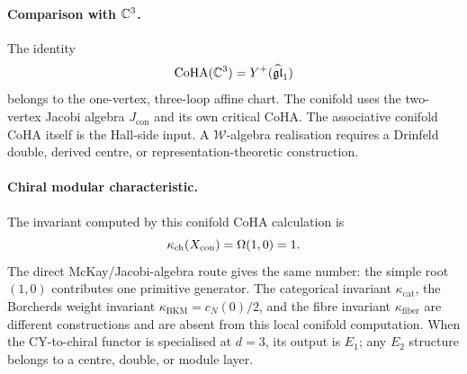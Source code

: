 \paragraph{Comparison with \(\mathbb{C}^3\).}
The identity
\[
  \mathrm{CoHA}(\mathbb{C}^3)=Y^+(\widehat{\mathfrak{gl}}_1)
\]
belongs to the one-vertex, three-loop affine chart. The conifold uses
the two-vertex Jacobi algebra \(J_{\mathrm{con}}\) and its own critical
CoHA. The associative conifold CoHA itself is the Hall-side input.
A \(\mathcal W\)-algebra realisation requires a Drinfeld double, derived
centre, or representation-theoretic construction.

\paragraph{Chiral modular characteristic.}
The invariant computed by this conifold CoHA calculation is
\[
  \kappa_{\mathrm{ch}}(X_{\mathrm{con}})
  =\Omega(1,0)=1.
\]
The direct McKay/Jacobi-algebra route gives the same number: the simple
root \((1,0)\) contributes one primitive generator.
The categorical invariant \(\kappa_{\mathrm{cat}}\), the Borcherds
weight invariant \(\kappa_{\mathrm{BKM}}=c_N(0)/2\), and the fibre
invariant \(\kappa_{\mathrm{fiber}}\) are different constructions and
are absent from this local conifold computation. When the
CY-to-chiral functor is specialised at \(d=3\), its output is \(E_1\);
any \(E_2\) structure belongs to a centre, double, or module layer.
